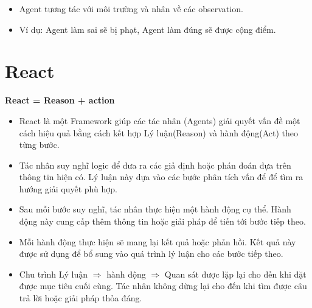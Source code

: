 \documentclass[final,letterpaper,twoside,12pt]{report}
\begin{document}
\begin{itemize}
	\item Agent tương tác với môi trường và nhân về các observation.
	\item Ví dụ: Agent làm sai sẽ bị phạt, Agent làm đúng sẽ được cộng điểm.
\end{itemize}

\section{React}

\textbf{React = Reason + action}

\begin{itemize}
	\item	React là một Framework giúp các tác nhân (Agents) giải quyết vấn đề một cách hiệu quả bằng cách kết hợp Lý luận(Reason) và hành động(Act) theo từng bước.
\end{itemize}

\begin{center}
\end{center}

\begin{itemize}
	\item Tác nhân suy nghĩ logic để đưa ra các giả định hoặc phán đoán đựa trên thông tin hiện có. Lý luận này dựa vào các bước phân tích vấn để để tìm ra hướng giải quyết phù hợp.
	\item Sau mỗi bước suy nghĩ, tác nhân thực hiện một hành động cụ thể. Hành động này cung cấp thêm thông tin hoặc giải pháp để tiến tới bước tiếp theo.
	\item Mỗi hành động thực hiện sẽ mang lại kết quả hoặc phản hồi. Kết quả này được sử dụng để bổ sung vào quá trình lý luận cho các bước tiếp theo.
	\item Chu trình Lý luận $\Rightarrow$ hành động $\Rightarrow$ Quan sát được lặp lại cho đến khi đặt được mục tiêu cuối cùng. Tác nhân không dừng lại cho đến khi tìm được câu trả lời hoặc giải pháp thỏa đáng.
\end{itemize}
\end{document}
